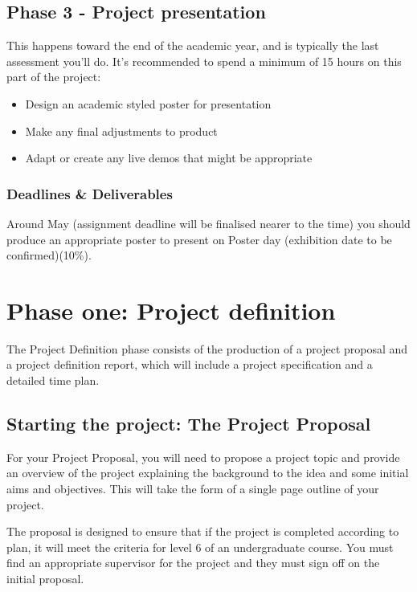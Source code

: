 \subsection{Phase 3 - Project presentation}
This happens toward the end of the academic year, and is typically the last assessment you'll do. It's recommended to spend a minimum of 15 hours on this part of the project:

\begin{itemize}
    \item Design an academic styled poster for presentation
    \item Make any final adjustments to product
    \item Adapt or create any live demos that might be appropriate
\end{itemize}

\subsubsection{Deadlines \& Deliverables}

Around May (assignment deadline will be finalised nearer to the time) you should produce an appropriate poster to present on Poster day (exhibition date to be confirmed)(10\%).

\section{Phase one: Project definition}

The Project Definition phase consists of the production of a project proposal and a project definition report, which will include a project specification and a detailed time plan.

\subsection{Starting the project: The Project Proposal}

For your Project Proposal, you will need to propose a project topic and provide an
overview of the project explaining the background to the idea and some initial aims and objectives. This will take the form of a single page outline of your project.

The proposal is designed to ensure that if the project is completed according to plan, it will meet the criteria for level 6 of an undergraduate course. You must find an appropriate supervisor for the project and they must sign off on the initial proposal.

